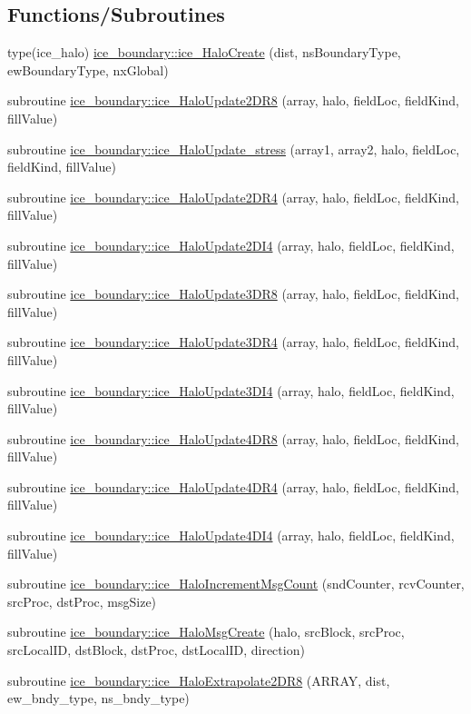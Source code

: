 \subsection*{Functions/Subroutines}
\begin{DoxyCompactItemize}
\item 
type(ice\_\-halo) \hyperlink{namespaceice__boundary_a75ebd3c57772fed459b69767634757d0}{ice\_\-boundary::ice\_\-HaloCreate} (dist, nsBoundaryType, ewBoundaryType, nxGlobal)
\item 
subroutine \hyperlink{namespaceice__boundary_a87df2a8a2b6172c4e0e56332a02521b8}{ice\_\-boundary::ice\_\-HaloUpdate2DR8} (array, halo, fieldLoc, fieldKind, fillValue)
\item 
subroutine \hyperlink{namespaceice__boundary_abc01c17b506f2d8ae4df422170803c6a}{ice\_\-boundary::ice\_\-HaloUpdate\_\-stress} (array1, array2, halo, fieldLoc, fieldKind, fillValue)
\item 
subroutine \hyperlink{namespaceice__boundary_ab91c33c3f42ce191fc4edd0d19f8e6ac}{ice\_\-boundary::ice\_\-HaloUpdate2DR4} (array, halo, fieldLoc, fieldKind, fillValue)
\item 
subroutine \hyperlink{namespaceice__boundary_a2054b95b373530c4cc9db12585f020dc}{ice\_\-boundary::ice\_\-HaloUpdate2DI4} (array, halo, fieldLoc, fieldKind, fillValue)
\item 
subroutine \hyperlink{namespaceice__boundary_a1b2030ac006215973cc7919ed7a0b8ba}{ice\_\-boundary::ice\_\-HaloUpdate3DR8} (array, halo, fieldLoc, fieldKind, fillValue)
\item 
subroutine \hyperlink{namespaceice__boundary_a124672d4024a3a64a1c1ed1b8c8d000b}{ice\_\-boundary::ice\_\-HaloUpdate3DR4} (array, halo, fieldLoc, fieldKind, fillValue)
\item 
subroutine \hyperlink{namespaceice__boundary_aded647fb747da9f8efb04f5a67a4247b}{ice\_\-boundary::ice\_\-HaloUpdate3DI4} (array, halo, fieldLoc, fieldKind, fillValue)
\item 
subroutine \hyperlink{namespaceice__boundary_adbf64712e93e11b0d0b099666f723af3}{ice\_\-boundary::ice\_\-HaloUpdate4DR8} (array, halo, fieldLoc, fieldKind, fillValue)
\item 
subroutine \hyperlink{namespaceice__boundary_a57e7b05282c54e5996798a87fa1a2e16}{ice\_\-boundary::ice\_\-HaloUpdate4DR4} (array, halo, fieldLoc, fieldKind, fillValue)
\item 
subroutine \hyperlink{namespaceice__boundary_aae151e9a894787fddeb6510b20919203}{ice\_\-boundary::ice\_\-HaloUpdate4DI4} (array, halo, fieldLoc, fieldKind, fillValue)
\item 
subroutine \hyperlink{namespaceice__boundary_af0d91bf9b575aaf512efac718c9b099c}{ice\_\-boundary::ice\_\-HaloIncrementMsgCount} (sndCounter, rcvCounter, srcProc, dstProc, msgSize)
\item 
subroutine \hyperlink{namespaceice__boundary_afcc8942d5d5ac4c20ac64915b98f376c}{ice\_\-boundary::ice\_\-HaloMsgCreate} (halo, srcBlock, srcProc, srcLocalID, dstBlock, dstProc, dstLocalID, direction)
\item 
subroutine \hyperlink{namespaceice__boundary_a9a42897a89fe284fadbec048591e5742}{ice\_\-boundary::ice\_\-HaloExtrapolate2DR8} (ARRAY, dist, ew\_\-bndy\_\-type, ns\_\-bndy\_\-type)
\end{DoxyCompactItemize}
